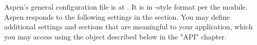 Aspen's general configuration file is at . It is in
-style format per the  module. Aspen responds to
the following settings in the  section. You may define additional
settings and sections that are meaningful to your application, which you may
access using the  object described below in the "API" chapter.


